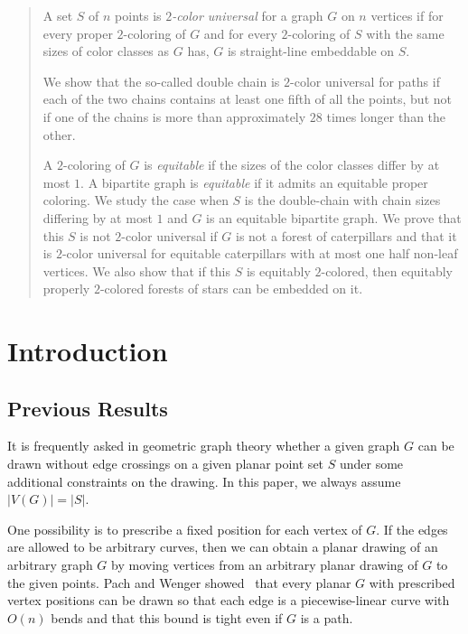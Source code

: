 \documentclass[12pt]{article}
\begin{document}
\begin{abstract}
A set $S$ of $n$ points is \emph{$2$-color universal} for a graph $G$ on $n$ vertices if for every proper 
$2$-coloring of $G$ and for every $2$-coloring of $S$ with the same sizes of color classes as $G$ has, 
$G$ is straight-line embeddable on $S$.

We show that the so-called double chain is $2$-color universal for paths if each of the two
chains contains at least one fifth of all the points, but not if one of the chains is more than 
approximately $28$ times longer than the other.

A $2$-coloring of $G$ is \emph{equitable} if the sizes of the color classes differ by at most $1$.
A bipartite graph is \emph{equitable} if it admits an equitable proper coloring.
We study the case when $S$ is the double-chain with chain sizes differing 
by at most $1$ and $G$ is an equitable bipartite graph. We prove that this $S$ is not $2$-color universal 
if $G$ is not a forest of caterpillars and that it is $2$-color universal for equitable caterpillars 
with at most one half non-leaf vertices. 
We also show that if this $S$ is equitably $2$-colored, then equitably properly $2$-colored 
forests of stars can be embedded on it.

\end{abstract}



\maketitle


\section{Introduction}
\subsection{Previous Results}
It is frequently asked in geometric graph theory whether
a given graph $G$ can be drawn without edge crossings on a given planar point set $S$ 
under some additional constraints on the drawing. In this paper, we always assume 
$|V(G)| = |S|$.

One possibility is to prescribe a fixed position for each vertex of $G$.
If the edges are allowed to be arbitrary curves, then we can obtain a planar drawing 
of an arbitrary graph $G$ by moving vertices from an arbitrary planar drawing of $G$ 
to the given points. Pach and Wenger showed~\cite{pachwenger} that every planar $G$ with 
prescribed vertex positions can be drawn so that each edge is a piecewise-linear curve with $O(n)$ 
bends and that this bound is tight even if $G$ is a path.
\end{document}
